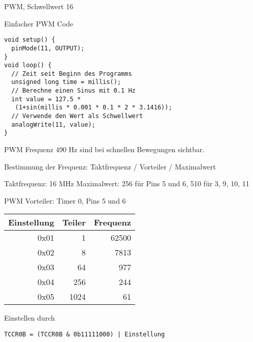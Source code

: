 \documentclass[bigger]{beamer}
\begin{document}
\begin{frame}[label=sec-2-4]{PWM, Schwellwert 16}
\end{frame}

\begin{frame}[fragile,label=sec-2-5]{Einfacher PWM Code}
 \begin{verbatim}
void setup() {
  pinMode(11, OUTPUT);
}
void loop() {
  // Zeit seit Beginn des Programms
  unsigned long time = millis();
  // Berechne einen Sinus mit 0.1 Hz
  int value = 127.5 *
   (1+sin(millis * 0.001 * 0.1 * 2 * 3.1416));
  // Verwende den Wert als Schwellwert
  analogWrite(11, value);
}
\end{verbatim}
\end{frame}

\begin{frame}[label=sec-2-6]{PWM Frequenz}
490 Hz sind bei schnellen Bewegungen sichtbar.

Bestimmung der Frequenz: Taktfrequenz / Vorteiler / Maximalwert

Taktfrequenz: 16 MHz
Maximalwert: 256 für Pins 5 und 6, 510 für 3, 9, 10, 11
\end{frame}

\begin{frame}[fragile,label=sec-2-7]{PWM Vorteiler: Timer 0, Pins 5 und 6}
 \begin{center}
\begin{tabular}{rrr}
Einstellung & Teiler & Frequenz\\
\hline
0x01 & 1 & 62500\\
0x02 & 8 & 7813\\
0x03 & 64 & 977\\
0x04 & 256 & 244\\
0x05 & 1024 & 61\\
\end{tabular}
\end{center}

Einstellen durch
\begin{verbatim}
TCCR0B = (TCCR0B & 0b11111000) | Einstellung
\end{verbatim}
\end{frame}
\end{document}
